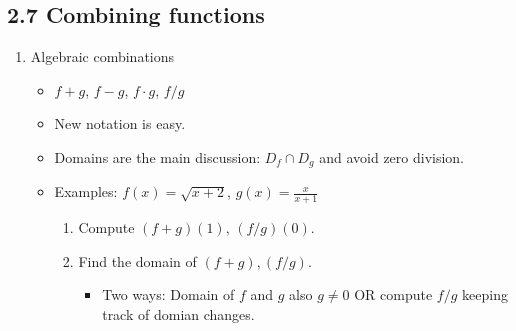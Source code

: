 \documentclass{article}
\begin{document}
\subsection{2.7 Combining functions}

\begin{enumerate}
\item Algebraic combinations
\begin{itemize}
\item $f+g$, \quad $f-g$, \quad $f\cdot g$, \quad $f/g$
\item New notation is easy.
\item Domains are the main discussion: $D_f \cap D_g$ and avoid zero division.
\item Examples: $f(x)=\sqrt{x+2}$, $g(x) = \frac{x}{x+1}$
\begin{enumerate}
\item Compute $(f+g)(1)$, $(f/g)(0)$.
\item Find the domain of $(f+g), (f/g)$. 
\begin{itemize}
\item Two ways: Domain of $f$ and $g$ also $g\neq 0$ OR compute $f/g$ keeping track of domian changes.
\end{itemize}
\end{enumerate}
\end{itemize}


\end{enumerate}
\end{document}

